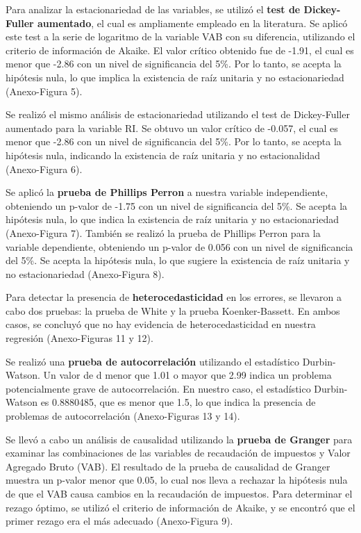 \documentclass[
  letterpaper,
]{article}
\begin{document}
Para analizar la estacionariedad de las variables, se utilizó el
\textbf{test de Dickey-Fuller aumentado}, el cual es ampliamente
empleado en la literatura. Se aplicó este test a la serie de logaritmo
de la variable VAB con su diferencia, utilizando el criterio de
información de Akaike. El valor crítico obtenido fue de -1.91, el cual
es menor que -2.86 con un nivel de significancia del 5\%. Por lo tanto,
se acepta la hipótesis nula, lo que implica la existencia de raíz
unitaria y no estacionariedad (Anexo-Figura 5).

Se realizó el mismo análisis de estacionariedad utilizando el test de
Dickey-Fuller aumentado para la variable RI. Se obtuvo un valor crítico
de -0.057, el cual es menor que -2.86 con un nivel de significancia del
5\%. Por lo tanto, se acepta la hipótesis nula, indicando la existencia
de raíz unitaria y no estacionalidad (Anexo-Figura 6).

Se aplicó la \textbf{prueba de Phillips Perron} a nuestra variable
independiente, obteniendo un p-valor de -1.75 con un nivel de
significancia del 5\%. Se acepta la hipótesis nula, lo que indica la
existencia de raíz unitaria y no estacionariedad (Anexo-Figura 7).
También se realizó la prueba de Phillips Perron para la variable
dependiente, obteniendo un p-valor de 0.056 con un nivel de
significancia del 5\%. Se acepta la hipótesis nula, lo que sugiere la
existencia de raíz unitaria y no estacionariedad (Anexo-Figura 8).

Para detectar la presencia de \textbf{heterocedasticidad} en los
errores, se llevaron a cabo dos pruebas: la prueba de White y la prueba
Koenker-Bassett. En ambos casos, se concluyó que no hay evidencia de
heterocedasticidad en nuestra regresión (Anexo-Figuras 11 y 12).

Se realizó una \textbf{prueba de autocorrelación} utilizando el
estadístico Durbin-Watson. Un valor de d menor que 1.01 o mayor que 2.99
indica un problema potencialmente grave de autocorrelación. En nuestro
caso, el estadístico Durbin-Watson es 0.8880485, que es menor que 1.5,
lo que indica la presencia de problemas de autocorrelación
(Anexo-Figuras 13 y 14).

Se llevó a cabo un análisis de causalidad utilizando la \textbf{prueba
de Granger} para examinar las combinaciones de las variables de
recaudación de impuestos y Valor Agregado Bruto (VAB). El resultado de
la prueba de causalidad de Granger muestra un p-valor menor que 0.05, lo
cual nos lleva a rechazar la hipótesis nula de que el VAB causa cambios
en la recaudación de impuestos. Para determinar el rezago óptimo, se
utilizó el criterio de información de Akaike, y se encontró que el
primer rezago era el más adecuado (Anexo-Figura 9).
\end{document}
